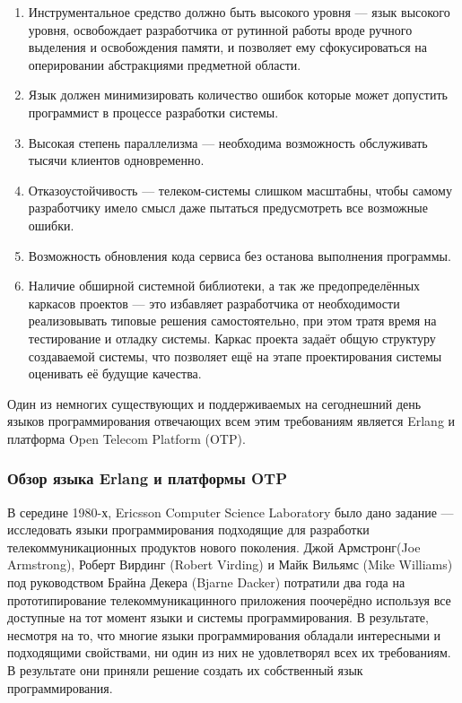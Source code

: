 \begin{enumerate}
	\item{} Инструментальное средство должно быть высокого уровня --- язык высокого уровня, освобождает разработчика от рутинной работы вроде ручного выделения и освобождения памяти, и позволяет ему сфокусироваться на оперировании абстракциями предметной области.
	\item{} Язык должен минимизировать количество ошибок которые может допустить программист в процессе разработки системы.
	\item{} Высокая степень параллелизма --- необходима возможность обслуживать тысячи клиентов одновременно.
	\item{} Отказоустойчивость --- телеком-системы слишком масштабны, чтобы самому разработчику имело смысл даже пытаться предусмотреть все возможные ошибки.
	\item{} Возможность обновления кода сервиса без останова выполнения программы.
	\item{} Наличие обширной системной библиотеки,  а так же предопределённых каркасов  проектов --- это избавляет разработчика от необходимости реализовывать типовые решения самостоятельно, при этом тратя время на тестирование и отладку системы. Каркас проекта задаёт общую структуру создаваемой системы, что позволяет ещё на этапе проектирования системы оценивать её будущие качества.
\end{enumerate}

\begin{par}
Один из немногих существующих и поддерживаемых на сегоднешний день языков программирования отвечающих всем этим требованиям является Erlang и платформа Open Telecom Platform (OTP).
\end{par}

\subsubsection{Обзор языка Erlang и платформы OTP}

\begin{par}
В середине 1980-х, Ericsson Computer Science Laboratory было дано задание --- исследовать языки программирования подходящие для разработки телекоммуникационных продуктов нового поколения. Джой Армстронг(Joe Armstrong), Роберт Вирдинг (Robert Virding) и Майк Вильямс (Mike Williams) под руководством Брайна Декера (Bjarne Dacker) потратили два года на прототипирование телекоммуникацинного приложения поочерёдно  используя все доступные на тот момент языки и системы программирования. В результате, несмотря на то, что многие языки программирования обладали интересными и подходящими свойствами, ни один из них не удовлетворял всех их требованиям. В результате они приняли решение создать их собственный язык программирования.
\end{par}

